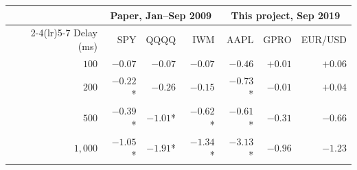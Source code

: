\begin{tabular}{rrrrrrr}
\toprule
 & \multicolumn{3}{c}{Paper, Jan--Sep 2009} & \multicolumn{3}{c}{This project, Sep 2019} \\
\cmidrule(lr){2-4}\cmidrule(lr){5-7}
Delay (ms) & SPY & QQQQ & IWM & AAPL & GPRO & EUR/USD \\
\midrule
$100$ & $-0.07$ & $-0.07$ & $-0.07$ & $-0.46$ & $+0.01$ & $+0.06$ \\
$200$ & $-0.22$* & $-0.26$ & $-0.15$ & $-0.73$* & $-0.01$ & $+0.04$ \\
$500$ & $-0.39$* & $-1.01$* & $-0.62$* & $-0.61$* & $-0.31$ & $-0.66$ \\
$1{,}000$ & $-1.05$* & $-1.91$* & $-1.34$* & $-3.13$* & $-0.96$ & $-1.23$ \\
\bottomrule
\end{tabular}
